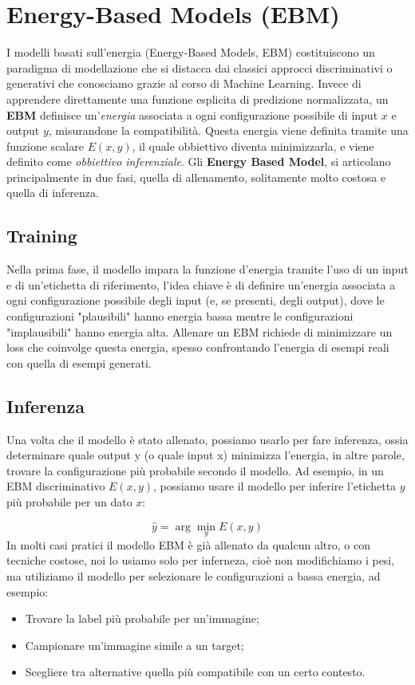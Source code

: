 \chapter{Energy-Based Models (EBM)}

I modelli basati sull'energia (Energy-Based Models, EBM) costituiscono un paradigma di modellazione che si distacca dai classici approcci discriminativi o generativi che conosciamo grazie al corso di Machine Learning. Invece di apprendere direttamente una funzione esplicita di predizione normalizzata, un \textbf{EBM} definisce un'\textit{energia} associata a ogni configurazione possibile di input $x$ e output $y$, misurandone la compatibilità. Questa energia viene definita tramite una funzione scalare $E(x, y)$, il quale obbiettivo diventa minimizzarla, e viene definito come \textit{obbiettivo inferenziale}. Gli \textbf{Energy Based Model}, si articolano principalmente in due fasi, quella di allenamento, solitamente molto costosa e quella di inferenza. 

\section{Training}
Nella prima fase, il modello impara la funzione d'energia tramite l'uso di un input e di un'etichetta di riferimento, l’idea chiave è di definire un’energia associata a ogni configurazione possibile degli input (e, se presenti, degli output), dove le configurazioni "plausibili" hanno energia bassa mentre le configurazioni "implausibili" hanno energia alta. Allenare un EBM richiede di minimizzare un loss che coinvolge questa energia, spesso confrontando l’energia di esempi reali con quella di esempi generati.
\section{Inferenza}
Una volta che il modello è stato allenato, possiamo usarlo per fare inferenza, ossia determinare quale output y (o quale input x) minimizza l’energia, in altre parole, trovare la configurazione più probabile secondo il modello. Ad esempio, in un EBM discriminativo $E(x,y)$, possiamo usare il modello per inferire l’etichetta $y$ più probabile per un dato $x$:

\begin{equation}
    \hat{y} = \arg\min_y E(x, y)
\end{equation}
In molti casi pratici il modello EBM è già allenato da qualcun altro, o con tecniche costose, noi lo usiamo solo per inferneza, cioè non modifichiamo i pesi, ma utiliziamo il modello per selezionare le configurazioni a bassa energia, ad esempio:
\begin{itemize}
    \item Trovare la label più probabile per un'immagine;
    \item Campionare un'immagine simile a un target;
    \item Scegliere tra alternative quella più compatibile con un certo contesto.
\end{itemize}


